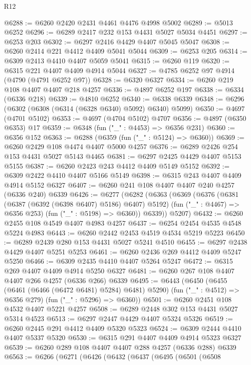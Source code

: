 \begin{lexlean}{R12}
\begin{coremodule}
@6288 := @6260 @2420 @2431 @4461 @4476 @4998 @5002
@6289 := @5013 @6252
@6296 := @6289 @2417 @232 @153 @4431 @5027 @5034 @4451
@6297 := @6253 @203
@6302 := @6297 @2416 @4429 @4407 @5045 @5047
@6308 := @6260 @2414 @221 @4412 @4409 @5041 @5044
@6309 := @6253 @205
@6314 := @6309 @2413 @4410 @4407 @5059 @5041
@6315 := @6260 @119
@6320 := @6315 @221 @4407 @4409 @4914 @5044
@6327 := @4785 @6252 @97 @4914 (@4790 (@4791 @6252 @97))
@6328 := @6320 @6327
@6334 := @6260 @219 @108 @4407 @4407 @218 @4257
@6336 := @4897 @6252 @197
@6338 := @6334 (@6336 @218)
@6339 := @4810 @6252
@6340 := @6338 @6339
@6348 := @6296 (@6302 (@6308 (@6314 (@6328 @6340) @5092) @6340) @5099)
@6350 := @4697 (@4701 @5102)
@6353 := @4697 (@4704 @5102) @4707
@6356 := @4897 (@6350 @6353) @17
@6359 := @6348 (fun ("_" : @4453) => @6356 @231)
@6360 := @6356 @152
@6363 := @6288 (@6359 (fun ("_" : @5124) => @6360))
@6369 := @6260 @2429 @108 @4474 @4407 @5000 @4257
@6376 := @6289 @2426 @254 @153 @4431 @5027 @5143 @4465
@6381 := @6297 @2425 @4429 @4407 @5153 @5155
@6387 := @6260 @2423 @243 @4412 @4409 @5149 @5152
@6392 := @6309 @2422 @4410 @4407 @5166 @5149
@6398 := @6315 @243 @4407 @4409 @4914 @5152 @6327
@6407 := @6260 @241 @108 @4407 @4407 @240 @4257 (@6336 @240) @6339
@6426 := @6277
    (@6282
      (@6363
        (@6369
          (@6376
            (@6381 (@6387 (@6392 (@6398 @6407) @5186) @6407) @5192)
            (fun ("_" : @4467) => @6356 @253)
            (fun ("_" : @5198) => @6360))
          @6339))
      @5207)
@6432 := @6260 @2455 @108 @4549 @4407 @4983 @4257
@6437 := @6254 @2454 @4535 @4548 @5224 @4983
@6443 := @6260 @2442 @2453 @4519 @4534 @5219 @5223
@6450 := @6289 @2439 @280 @153 @4431 @5027 @5241 @4510
@6455 := @6297 @2438 @4429 @4407 @5251 @5253
@6461 := @6260 @2436 @269 @4412 @4409 @5247 @5250
@6466 := @6309 @2435 @4410 @4407 @5264 @5247
@6472 := @6315 @269 @4407 @4409 @4914 @5250 @6327
@6481 := @6260 @267 @108 @4407 @4407 @266 @4257 (@6336 @266) @6339
@6495 := @6443
    (@6450
      (@6455 (@6461 (@6466 (@6472 @6481) @5284) @6481) @5290)
      (fun ("_" : @4512) => @6356 @279)
      (fun ("_" : @5296) => @6360))
@6501 := @6260 @2451 @108 @4532 @4407 @5221 @4257
@6508 := @6289 @2448 @302 @153 @4431 @5027 @5314 @4523
@6513 := @6297 @2447 @4429 @4407 @5324 @5326
@6519 := @6260 @2445 @291 @4412 @4409 @5320 @5323
@6524 := @6309 @2444 @4410 @4407 @5337 @5320
@6530 := @6315 @291 @4407 @4409 @4914 @5323 @6327
@6539 := @6260 @289 @108 @4407 @4407 @288 @4257 (@6336 @288) @6339
@6563 := @6266
    (@6271
      (@6426
        (@6432
          (@6437
            (@6495
              (@6501
                (@6508

\end{coremodule}
\end{lexlean}

